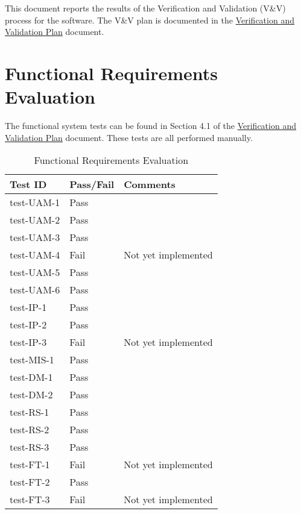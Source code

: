 \documentclass[12pt, titlepage]{article}
\begin{document}
\newpage

\tableofcontents

\listoftables %

\listoffigures %

\newpage


This document reports the results of the Verification and Validation (V\&V)
process for the \progname software. The V\&V plan is documented in the
\href{https://github.com/PlutosCapstone/Plutos/blob/main/docs/VnVPlan/VnVPlan.pdf}{Verification
and Validation Plan} document. 

\section{Functional Requirements Evaluation}

The functional system tests can be found in Section 4.1 of the
\href{https://github.com/PlutosCapstone/Plutos/blob/main/docs/VnVPlan/VnVPlan.pdf}{Verification
and Validation Plan} document. These tests are all performed manually.

\begin{table}[h!]
\centering
\caption{Functional Requirements Evaluation}
\begin{tabularx}{\textwidth}{>{\centering\arraybackslash}X >{\centering\arraybackslash}X >{\centering\arraybackslash}X}
  \toprule
  \textbf{Test ID} & \textbf{Pass/Fail} & \textbf{Comments} \\
  \midrule
  test-UAM-1 & Pass &  \\
  test-UAM-2 & Pass &  \\
  test-UAM-3 & Pass &  \\
  test-UAM-4 & Fail & Not yet implemented \\
  test-UAM-5 & Pass &  \\
  test-UAM-6 & Pass &  \\
  \midrule
  test-IP-1 & Pass & \\
  test-IP-2 & Pass & \\
  test-IP-3 & Fail & Not yet implemented \\
  \midrule
  test-MIS-1 & Pass & \\
  \midrule
  test-DM-1 & Pass & \\
  test-DM-2 & Pass & \\
  \midrule
  test-RS-1 & Pass & \\
  test-RS-2 & Pass & \\
  test-RS-3 & Pass & \\
  \midrule
  test-FT-1 & Fail & Not yet implemented \\
  test-FT-2 & Pass & \\
  test-FT-3 & Fail & Not yet implemented \\
  \bottomrule
\end{tabularx}
\end{table}
\end{document}
